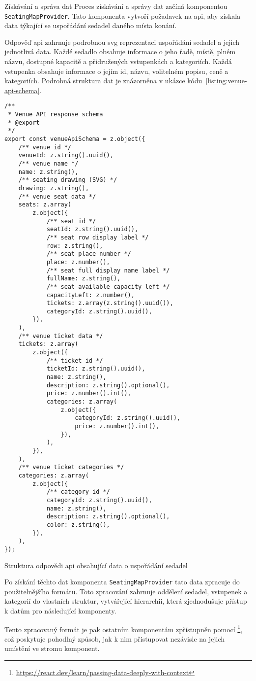 \begin{subsection}{Získávání a správa dat}
    \label{subsec:implementace-seating-data}
    Proces získávání a správy dat začíná komponentou \texttt{SeatingMapProvider}.
    Tato komponenta vytvoří požadavek na \ac{api}, aby získala data týkající se uspořádání sedadel daného místa konání.

    Odpověď \ac{api} zahrnuje podrobnou \ac{svg} reprezentaci uspořádání sedadel a jejich jednotlivá data.
    Každé sedadlo obsahuje informace o jeho řadě, místě, plném názvu, dostupné kapacitě a přidružených vstupenkách a kategoriích.
    Každá vstupenka obsahuje informace o jejím id, názvu, volitelném popisu, ceně a kategoriích.
    Podrobná struktura dat je znázorněna v ukázce kódu~\ref{listing:venue-api-schema}.

    \begin{listing}[H]
        \begin{verbatim}
/**
 * Venue API response schema
 * @export
 */
export const venueApiSchema = z.object({
	/** venue id */
	venueId: z.string().uuid(),
	/** venue name */
	name: z.string(),
	/** seating drawing (SVG) */
	drawing: z.string(),
	/** venue seat data */
	seats: z.array(
		z.object({
			/** seat id */
			seatId: z.string().uuid(),
			/** seat row display label */
			row: z.string(),
			/** seat place number */
			place: z.number(),
			/** seat full display name label */
			fullName: z.string(),
			/** seat available capacity left */
			capacityLeft: z.number(),
			tickets: z.array(z.string().uuid()),
			categoryId: z.string().uuid(),
		}),
	),
	/** venue ticket data */
	tickets: z.array(
		z.object({
			/** ticket id */
			ticketId: z.string().uuid(),
			name: z.string(),
			description: z.string().optional(),
			price: z.number().int(),
			categories: z.array(
				z.object({
					categoryId: z.string().uuid(),
					price: z.number().int(),
				}),
			),
		}),
	),
	/** venue ticket categories */
	categories: z.array(
		z.object({
			/** category id */
			categoryId: z.string().uuid(),
			name: z.string(),
			description: z.string().optional(),
			color: z.string(),
		}),
	),
});
        \end{verbatim}
        \caption{Struktura odpovědi \ac{api} obsahující data o uspořádání sedadel}
        \label{listing:venue-api-schema}
    \end{listing}

    Po získání těchto dat komponenta \texttt{SeatingMapProvider} tato data zpracuje do použitelnějšího formátu.
    Toto zpracování zahrnuje oddělení sedadel, vstupenek a kategorií do vlastních struktur, vytvářející hierarchii, která zjednodušuje přístup k datům pro následující komponenty.

    Tento zpracovaný formát je pak ostatním komponentám zpřístupněn pomocí \footnote{\url{https://react.dev/learn/passing-data-deeply-with-context}}, což poskytuje pohodlný způsob, jak k nim přistupovat nezávisle na jejich umístění ve stromu komponent.
\end{subsection}

